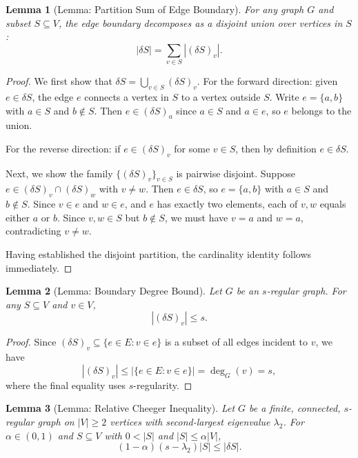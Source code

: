 \documentclass[11pt]{article}
\theoremstyle{plain}
\newtheorem*{lemma}{Lemma}
\theoremstyle{definition}
\theoremstyle{remark}
\begin{document}
\begin{lemma}[Lemma: Partition Sum of Edge Boundary]
For any graph $G$ and subset $S \subseteq V$, the edge boundary decomposes as a disjoint union over vertices in $S$:
\[
|\delta S| = \sum_{v \in S} |(\delta S)_v|.
\]
\end{lemma}

\begin{proof}
We first show that $\delta S = \bigcup_{v \in S} (\delta S)_v$. For the forward direction: given $e \in \delta S$, the edge $e$ connects a vertex in $S$ to a vertex outside $S$. Write $e = \{a, b\}$ with $a \in S$ and $b \notin S$. Then $e \in (\delta S)_a$ since $a \in S$ and $a \in e$, so $e$ belongs to the union.

For the reverse direction: if $e \in (\delta S)_v$ for some $v \in S$, then by definition $e \in \delta S$.

Next, we show the family $\{(\delta S)_v\}_{v \in S}$ is pairwise disjoint. Suppose $e \in (\delta S)_v \cap (\delta S)_w$ with $v \neq w$. Then $e \in \delta S$, so $e = \{a,b\}$ with $a \in S$ and $b \notin S$. Since $v \in e$ and $w \in e$, and $e$ has exactly two elements, each of $v, w$ equals either $a$ or $b$. Since $v, w \in S$ but $b \notin S$, we must have $v = a$ and $w = a$, contradicting $v \neq w$.

Having established the disjoint partition, the cardinality identity follows immediately.
\end{proof}

\begin{lemma}[Lemma: Boundary Degree Bound]
Let $G$ be an $s$-regular graph. For any $S \subseteq V$ and $v \in V$,
\[
|(\delta S)_v| \leq s.
\]
\end{lemma}

\begin{proof}
Since $(\delta S)_v \subseteq \{e \in E : v \in e\}$ is a subset of all edges incident to $v$, we have
\[
|(\delta S)_v| \leq |\{e \in E : v \in e\}| = \deg_G(v) = s,
\]
where the final equality uses $s$-regularity.
\end{proof}

\begin{lemma}[Lemma: Relative Cheeger Inequality]
Let $G$ be a finite, connected, $s$-regular graph on $|V| \geq 2$ vertices with second-largest eigenvalue $\lambda_2$. For $\alpha \in (0,1)$ and $S \subseteq V$ with $0 < |S|$ and $|S| \leq \alpha |V|$,
\[
(1 - \alpha)(s - \lambda_2)|S| \leq |\delta S|.
\]
\end{lemma}
\end{document}
